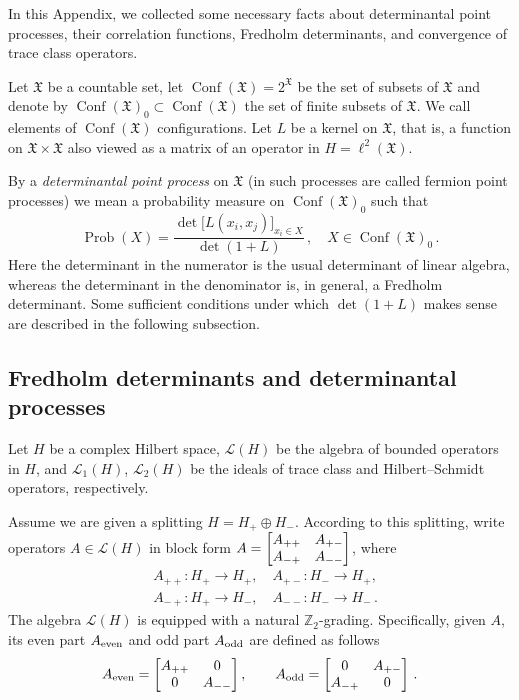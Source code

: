 \documentclass[12pt]{amsart}
\newcommand{\Prob}{\operatorname{Prob}}
\newcommand{\Conf}{\operatorname{Conf}}
\newcommand{\CX}{\Conf(\X)}
\newcommand{\CXf}{\CX_0}
\newcommand{\X}{\mathfrak{X}}
\newcommand{\Z}{\mathbb{Z}}
\newcommand{\Lc}{\mathcal{L}}
\theoremstyle{plain}
\theoremstyle{definition}
\numberwithin{equation}{section}
\begin{document}
In this Appendix, we collected some necessary facts about
determinantal point processes, their correlation functions, 
Fredholm determinants, 
and convergence of trace class operators. 

Let $\X$ be a countable set, let $\CX=2^{\X}$ be the set of subsets
of $\X$ and denote by $\CXf\subset\CX$ the set of finite subsets of $\X$.
We call elements of $\CX$ configurations. 
Let $L$ be a kernel on $\X$, that is, a function on $\X\times\X$
also viewed as a matrix of an operator in $H=\ell^2(\X)$. 

By a \emph{determinantal point process} on $\X$ (in \cite{DVJ}
such processes are called fermion point processes) 
 we mean a probability measure on
$\CXf$ such that
$$
\Prob(X)=\frac{\det\big[L(x_i,x_j)\big]_{x_i\in X}}{\det(1+L)}\,, \quad X\in\CXf\,.
$$
Here the determinant in the numerator is the usual determinant of linear
algebra, whereas
the determinant in the denominator is, in general, a Fredholm determinant.
Some sufficient conditions under which $\det(1+L)$ makes sense
are described in the following subsection.

\subsection{Fredholm determinants and determinantal processes}

Let $H$ be a complex Hilbert space, $\Lc(H)$ be the algebra of bounded
operators in $H$, and $\Lc_1(H)$, $\Lc_2(H)$ be the ideals of trace class
and Hilbert--Schmidt operators, respectively.

Assume we are given a splitting $H=H_+\oplus H_-$. 
According to this splitting, write operators $A\in\Lc(H)$ in block form 
$A=\bmatrix A_{++} & A_{+-}\\ A_{-+} & A_{--}\endbmatrix$, where 
%
\begin{align*}
&A_{++}: H_+\to H_+, \quad A_{+-}: H_-\to H_+, \\
&A_{-+}: H_+\to H_-, \quad A_{--}: H_-\to H_-\,.
\end{align*}
%
The algebra $\Lc(H)$ is equipped with a natural $\Z_2$-grading. Specifically,
given $A$, its even part $A_{\textup{even}}$ and odd part $A_{\textup{odd}}$
are defined as follows
%
\begin{equation*}
A_{\textup{even}}=\bmatrix A_{++} & 0\\ 0 & A_{--}\endbmatrix, \qquad
A_{\textup{odd}}=\bmatrix 0 & A_{+-}\\ A_{-+} & 0\endbmatrix \,.
\end{equation*}
%
\end{document}
